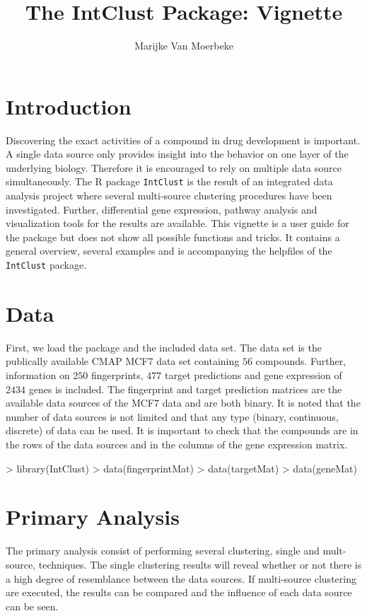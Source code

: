 \documentclass[a4paper]{article}
\title{The IntClust Package: Vignette}
\author{Marijke Van Moerbeke}
\begin{document}
\maketitle
\tableofcontents
\pagebreak{}


\section{Introduction }
Discovering the exact activities of a compound in drug development is important.
A single data source only provides insight into the behavior on one layer of the
underlying biology. Therefore it is encouraged to rely on multiple data source
simultaneously. The R package \texttt{IntClust} is the result of an integrated
data analysis project where several multi-source clustering procedures have been
investigated. Further, differential gene expression, pathway analysis and
visualization tools for the results are available. This vignette is a user guide
for the package but does not show all possible functions and tricks. It
contains a general overview, several examples and is accompanying the
helpfiles of the \texttt{IntClust} package.
\section{Data}
First, we load the package and the included data set. The data set is the
publically available CMAP MCF7 data set containing $56$ compounds. Further,
information on $250$ fingerprints, $477$ target predictions and gene
expression of $2434$ genes is included. The fingerprint and target prediction
matrices are the available data sources of the MCF7 data and are both binary. It
is noted that the number of data sources is not limited and that any type
(binary, continuous, discrete) of data can be used. It is important to check
that the compounds are in the rows of the data sources and in the columns of
the gene expression matrix.

\begin{Schunk}
\begin{Sinput}
> library(IntClust)
> data(fingerprintMat)
> data(targetMat)
> data(geneMat)
\end{Sinput}
\end{Schunk}
\section{Primary Analysis}
The primary analysis consist of performing several clustering, single and
mult-source, techniques. The single clustering results will reveal whether or
not there is a high degree of resemblance between the data sources. If
multi-source clustering are executed, the results can be compared and the
influence of each data source can be seen. 
\end{document}
